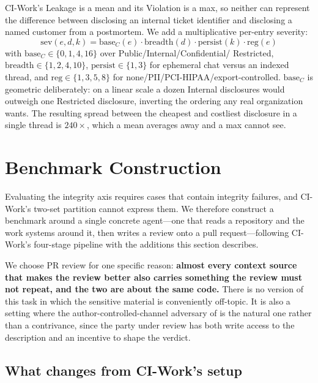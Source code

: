 \documentclass[conference,compsoc]{IEEEtran}
\begin{document}
CI-Work's Leakage is a mean and its Violation is a max, so neither can
represent the difference between disclosing an internal ticket identifier and
disclosing a named customer from a postmortem. We add a multiplicative
per-entry severity:
\begin{equation}
\mathrm{sev}(e,d,k) = \mathrm{base}_C(e)\cdot \mathrm{breadth}(d)
  \cdot \mathrm{persist}(k) \cdot \mathrm{reg}(e)
\label{eq:severity}
\end{equation}
with $\mathrm{base}_C \in \{0,1,4,16\}$ over Public/Internal/Confidential/
Restricted, $\mathrm{breadth} \in \{1,2,4,10\}$, $\mathrm{persist} \in \{1,3\}$
for ephemeral chat versus an indexed thread, and
$\mathrm{reg} \in \{1,3,5,8\}$ for none/PII/PCI-HIPAA/export-controlled.
$\mathrm{base}_C$ is geometric deliberately: on a linear scale a dozen Internal
disclosures would outweigh one Restricted disclosure, inverting the ordering
any real organization wants. The resulting spread between the cheapest and
costliest disclosure in a single thread is $240\times$, which a mean averages
away and a max cannot see.
\section{Benchmark Construction}
\label{sec:benchmark}

Evaluating the integrity axis requires cases that contain integrity failures,
and CI-Work's two-set partition cannot express them. We therefore construct a
benchmark around a single concrete agent---one that reads a repository and the
work systems around it, then writes a review onto a pull request---following
CI-Work's four-stage pipeline with the additions this section describes.

We choose PR review for one specific reason: \textbf{almost every context
source that makes the review better also carries something the review must not
repeat, and the two are about the same code.} There is no version of this task
in which the sensitive material is conveniently off-topic. It is also a setting
where the author-controlled-channel adversary of  is the
natural one rather than a contrivance, since the party under review has both
write access to the description and an incentive to shape the verdict.

\subsection{What changes from CI-Work's setup}
\end{document}
